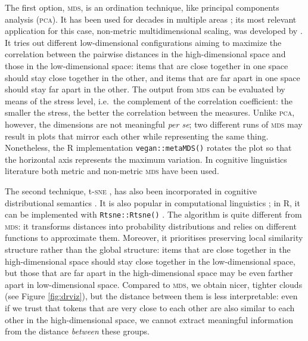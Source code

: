 \documentclass[
]{book}
\begin{document}
The first option, \textsc{mds}, is an ordination technique, like principal components analysis (\textsc{pca}). It has been used for decades in multiple areas \autocite[e.g.][]{cox.cox_2008}; its most relevant application for this case, non-metric multidimensional scaling, was developed by \textcite{kruskal_1964}. It tries out different low-dimensional configurations aiming to maximize the correlation between the pairwise distances in the high-dimensional space and those in the low-dimensional space: items that are close together in one space should stay close together in the other, and items that are far apart in one space should stay far apart in the other.
The output from \textsc{mds} can be evaluated by means of the stress level, i.e.~the complement of the correlation coefficient: the smaller the stress, the better the correlation between the measures.
Unlike \textsc{pca}, however, the dimensions are not meaningful \emph{per se}; two different runs of \textsc{mds} may result in plots that mirror each other while representing the same thing. Nonetheless, the R implementation \texttt{vegan::metaMDS()} \autocite{R-vegan} rotates the plot so that the horizontal axis represents the maximum variation.
In cognitive linguistics literature both metric \autocite{koptjevskaja-tamm.sahlgren_2014,hilpert.correiasaavedra_2017,hilpert.flach_2020}
and non-metric \textsc{mds} \autocite{heylen.etal_2012,heylen.etal_2015,perek_2016,depascale_2019} have been used.

The second technique, t-\textsc{sne} \autocite{Rtsne2008,Rtsne2014}, has also been incorporated in cognitive distributional semantics \autocite{perek_2018,depascale_2019}.
It is also popular in computational linguistics \autocite{smilkov.etal_2016,jurafsky.martin_2020}; in R, it can be implemented with \texttt{Rtsne::Rtsne()} \autocite{R-Rtsne}.
The algorithm is quite different from \textsc{mds}: it transforms distances into probability distributions and relies on different functions to approximate them. Moreover, it prioritises preserving local similarity structure rather than the global structure: items that are close together in the high-dimensional space should stay close together in the low-dimensional space, but those that are far apart in the high-dimensional space may be even farther apart in low-dimensional space.
Compared to \textsc{mds}, we obtain nicer, tighter clouds (see Figure \ref{fig:drviz}), but the distance between them is less interpretable: even if we trust that tokens that are very close to each other are also similar to each other in the high-dimensional space, we cannot extract meaningful information from the distance \emph{between} these groups.
\end{document}
